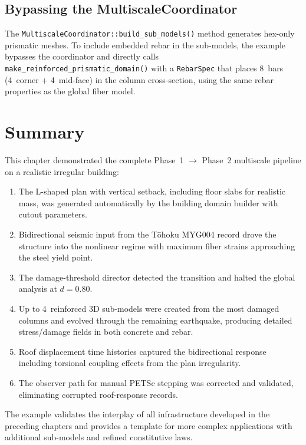 \subsection{Bypassing the MultiscaleCoordinator}
\label{sec:lshaped-bypass-coordinator}

The \texttt{MultiscaleCoordinator::build\_sub\_models()} method generates
hex-only prismatic meshes.  To include embedded rebar in the sub-models,
the example bypasses the coordinator and directly calls
\texttt{make\_reinforced\_prismatic\_domain()} with a \texttt{RebarSpec}
that places 8~bars (4~corner + 4~mid-face) in the column cross-section,
using the same rebar properties as the global fiber model.


\section{Summary}
\label{sec:lshaped-summary}

This chapter demonstrated the complete Phase~1 $\to$ Phase~2
multiscale pipeline on a realistic irregular building:

\begin{enumerate}
  \item The L-shaped plan with vertical setback, including floor slabs
        for realistic mass, was generated automatically by the building
        domain builder with cutout parameters.
  \item Bidirectional seismic input from the T\={o}hoku MYG004 record
        drove the structure into the nonlinear regime with maximum
        fiber strains approaching the steel yield point.
  \item The damage-threshold director detected the transition and halted
        the global analysis at $d = 0.80$.
  \item Up to 4~reinforced 3D sub-models were created from the most
        damaged columns and evolved through the remaining earthquake,
        producing detailed stress/damage fields in both concrete and rebar.
  \item Roof displacement time histories captured the bidirectional
        response including torsional coupling effects from the plan
        irregularity.
  \item The observer path for manual PETSc stepping was corrected and
        validated, eliminating corrupted roof-response records.
\end{enumerate}

The example validates the interplay of all infrastructure developed
in the preceding chapters and provides a template for more complex
applications with additional sub-models and refined constitutive laws.
